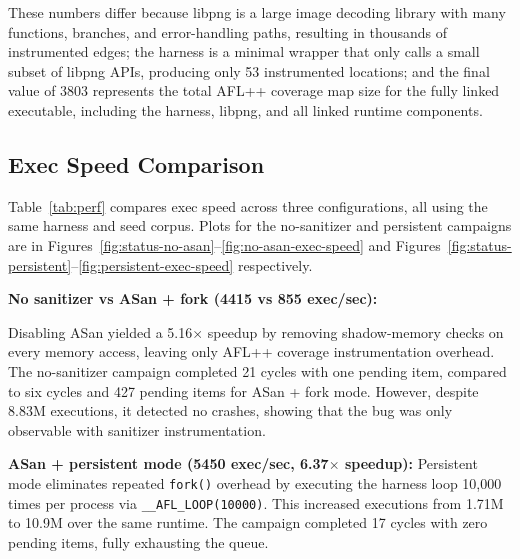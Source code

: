 \documentclass[letterpaper,twocolumn,10pt]{article}
\begin{document}
These numbers differ because libpng is a large image decoding library with many functions, branches, and error-handling paths, resulting in thousands of instrumented edges; the harness is a minimal wrapper that only calls a small subset of libpng APIs, producing only 53 instrumented locations; and the final value of 3803 represents the total AFL++ coverage map size for the fully linked executable, including the harness, libpng, and all linked runtime components.
 
\subsection{Exec Speed Comparison}
 
Table~\ref{tab:perf} compares exec speed across three
configurations, all using the same harness and seed corpus.
Plots for the no-sanitizer and persistent campaigns are in
Figures~\ref{fig:status-no-asan}--\ref{fig:no-asan-exec-speed}
and Figures~\ref{fig:status-persistent}--\ref{fig:persistent-exec-speed}
respectively.
 
\textbf{No sanitizer vs ASan + fork (4415 vs 855 exec/sec):}

Disabling ASan yielded a 5.16$\times$ speedup by removing shadow-memory checks on every memory access, leaving only AFL++ coverage instrumentation overhead. The no-sanitizer campaign completed 21 cycles with one pending item, compared to six cycles and 427 pending items for ASan + fork mode. However, despite 8.83M executions, it detected no crashes, showing that the bug was only observable with sanitizer instrumentation.
 
\textbf{ASan + persistent mode (5450 exec/sec, 6.37$\times$ speedup):}
Persistent mode eliminates repeated \texttt{fork()} overhead by executing the harness loop 10,000 times per process via \texttt{\_\_AFL\_LOOP(10000)}. This increased executions from 1.71M to 10.9M over the same runtime. The campaign completed 17 cycles with zero pending items, fully exhausting the queue.
 
\end{document}
